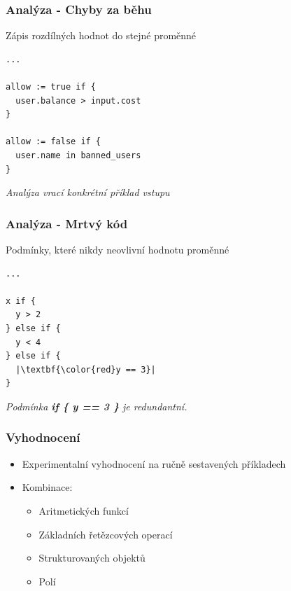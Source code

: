 \begin{frame}[fragile]
    \frametitle{Analýza - Chyby za běhu}
    Zápis rozdílných hodnot do stejné proměnné

    \vspace{.5cm}
    \begin{lstlisting}[language=Rego]
...

allow := true if {
  user.balance > input.cost
}

allow := false if {
  user.name in banned_users
}
\end{lstlisting}
    \vspace{.5cm}

  \textit{Analýza vrací konkrétní příklad vstupu}
\end{frame}

\begin{frame}[fragile]
    \frametitle{Analýza - Mrtvý kód}
    Podmínky, které nikdy neovlivní hodnotu proměnné

    \vspace{.5cm}
    \begin{lstlisting}[language=Rego, escapechar=|]
...

x if {
  y > 2
} else if {
  y < 4
} else if {
  |\textbf{\color{red}y == 3}|
}
\end{lstlisting}
  \hspace{5mm}
  \small\textit{Podmínka \textbf{if \{ y == 3 \}} je redundantní.}
    \vspace{.5cm}
\end{frame}

\begin{frame}
    \frametitle{Vyhodnocení}
    \begin{itemize}
        \item Experimentalní vyhodnocení na ručně sestavených příkladech
        \item Kombinace:
          \begin{itemize}
              \item Aritmetických funkcí
              \item Základních řetězcových operací
              \item Strukturovaných objektů
              \item Polí
          \end{itemize}
    \end{itemize}
\end{frame}

